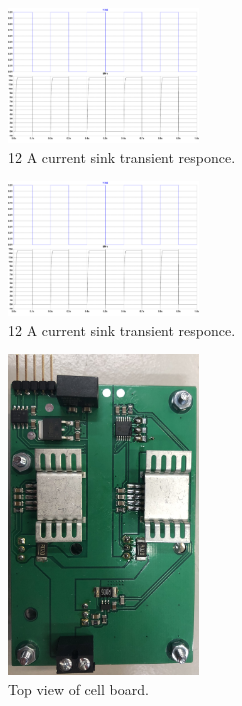 \begin{figure}[h!]
    \centering
    \includegraphics[width=0.45\textwidth]{CurrentSinkTransient.pdf}
    \caption{12 A current sink transient responce.}
    \label{fig:CurrentSinkTransient}
\end{figure}

\begin{figure}[h!]
    \centering
    \includegraphics[width=0.45\textwidth]{CurrentSinkTransient.pdf}
    \caption{12 A current sink transient responce.}
    \label{fig:CurrentSinkTransient}
\end{figure}

\begin{figure}[h!]
    \centering
    \includegraphics[width=0.45\textwidth]{CellBoardTop.jpg}
    \caption{Top view of cell board.}
    \label{fig:CellBoardTop}
\end{figure}

